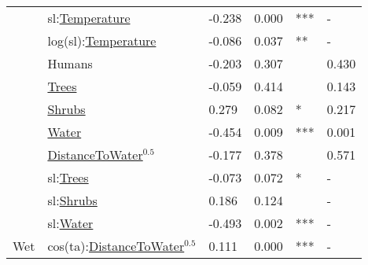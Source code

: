 \begin{tabular}[t]{llllll}
 & sl:\underline{Temperature} & -0.238 & 0.000 & *** & -\\

 & log(sl):\underline{Temperature} & -0.086 & 0.037 & ** & -\\

 & Humans & -0.203 & 0.307 &  & 0.430\\

 & \underline{Trees} & -0.059 & 0.414 &  & 0.143\\

 & \underline{Shrubs} & 0.279 & 0.082 & * & 0.217\\

 & \underline{Water} & -0.454 & 0.009 & *** & 0.001\\

 & \underline{DistanceToWater}$^{0.5}$ & -0.177 & 0.378 &  & 0.571\\

 & sl:\underline{Trees} & -0.073 & 0.072 & * & -\\

 & sl:\underline{Shrubs} & 0.186 & 0.124 &  & -\\

 & sl:\underline{Water} & -0.493 & 0.002 & *** & -\\

\multirow{-16}{*}{\raggedright\arraybackslash Wet} & cos(ta):\underline{DistanceToWater}$^{0.5}$ & 0.111 & 0.000 & *** & -\\
\bottomrule
\end{tabular}
